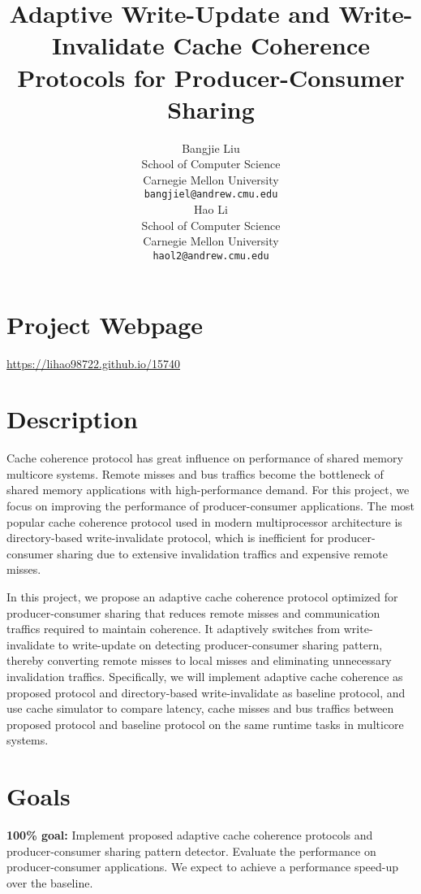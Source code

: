 \documentclass{article} %
\title{Adaptive Write-Update and Write-Invalidate Cache Coherence Protocols for Producer-Consumer Sharing}
\author{
Bangjie Liu \\
School of Computer Science \\
Carnegie Mellon University \\
\texttt{bangjiel@andrew.cmu.edu} \\
\And
Hao Li \\
School of Computer Science \\
Carnegie Mellon University \\
\texttt{haol2@andrew.cmu.edu} \\
}
\begin{document}
\maketitle

\section{Project Webpage}
\begin{center}
   \url{https://lihao98722.github.io/15740}
\end{center}


\section{Description}

Cache coherence protocol has great influence on performance of shared memory multicore systems. Remote misses and bus traffics become the bottleneck of shared memory applications with high-performance demand. For this project, we focus on improving the performance of producer-consumer applications. The most popular cache coherence protocol used in modern multiprocessor architecture is directory-based write-invalidate protocol, which is inefficient for producer-consumer sharing due to extensive invalidation traffics and expensive remote misses.

In this project, we propose an adaptive cache coherence protocol optimized for producer-consumer sharing that reduces remote misses and communication traffics required to maintain coherence. It adaptively switches from write-invalidate to write-update on detecting producer-consumer sharing pattern, thereby converting remote misses to local misses and eliminating unnecessary invalidation traffics. Specifically, we will implement adaptive cache coherence as proposed protocol and directory-based write-invalidate as baseline protocol, and use cache simulator to compare latency, cache misses and bus traffics between proposed protocol and baseline protocol on the same runtime tasks in multicore systems.


\section{Goals}

\textbf{100\% goal:} Implement proposed adaptive cache coherence protocols and producer-consumer sharing pattern detector. Evaluate the performance on producer-consumer applications. We expect to achieve a performance speed-up over the baseline.
\end{document}
